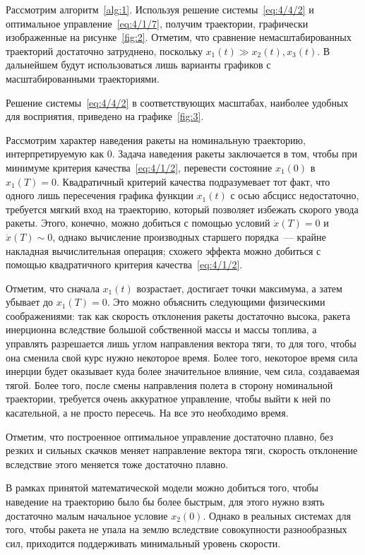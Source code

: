 Рассмотрим алгоритм~\vref{alg:1}. Используя решение системы~\ref{eq:4/4/2} и оптимальное управление~\ref{eq:4/1/7}, получим траектории, графически изображенные на рисунке~\ref{fig:2}. Отметим, что сравнение немасштабированных траекторий достаточно затруднено, поскольку $x_1(t) \gg x_2(t), x_3(t)$. В дальнейшем будут использоваться лишь варианты графиков с масштабированными траекториями.


Решение системы~\ref{eq:4/4/2} в соответствующих масштабах, наиболее удобных для восприятия, приведено на графике~\ref{fig:3}.

\br

Рассмотрим характер наведения ракеты на номинальную траекторию, интерпретируемую как $0$. Задача наведения ракеты заключается в том, чтобы при минимуме критерия качества~\ref{eq:4/1/2}, перевести состояние $x_1(0)$ в $x_1(T)=0$. Квадратичный критерий качества подразумевает тот факт, что одного лишь пересечения графика функции $x_1(t)$ с осью абсцисс недостаточно, требуется мягкий вход на траекторию, который позволяет избежать скорого увода ракеты. Этого, конечно, можно добиться с помощью условий $\dot{x}(T)=0$ и $\ddot{x}(T) \sim 0$, однако вычисление производных старшего порядка~--- крайне накладная вычислительная операция; схожего эффекта\cite{XU} можно добиться с помощью квадратичного критерия качества~\ref{eq:4/1/2}.

Отметим, что сначала $x_1(t)$ возрастает, достигает точки максимума, а затем убывает до $x_1(T)=0$. Это можно объяснить следующими физическими соображениями: так как скорость отклонения ракеты достаточно высока, ракета инерционна вследствие большой собственной массы и массы топлива, а управлять разрешается лишь углом направления вектора тяги, то для того, чтобы она сменила свой курс нужно некоторое время. Более того, некоторое время сила инерции будет оказывает куда более значительное влияние, чем сила, создаваемая тягой. Более того, после смены направления полета в сторону номинальной траектории, требуется очень аккуратное управление, чтобы выйти к ней по касательной, а не просто пересечь. На все это необходимо время.

Отметим, что построенное оптимальное управление достаточно плавно, без резких и сильных скачков меняет направление вектора тяги, скорость отклонение вследствие этого меняется тоже достаточно плавно.

В рамках принятой математической модели можно добиться того, чтобы наведение на траекторию было бы более быстрым, для этого нужно взять достаточно малым начальное условие $x_2(0)$. Однако в реальных системах для того, чтобы ракета не упала на землю вследствие совокупности разнообразных сил, приходится поддерживать минимальный уровень скорости.

